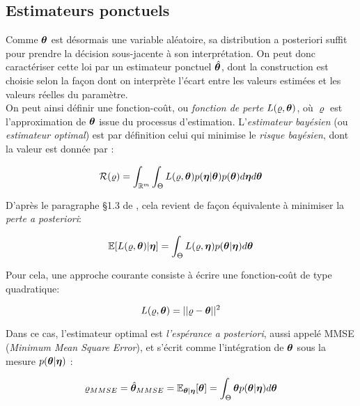 \subsection{Estimateurs ponctuels}
Comme ${\bm{\theta}}$ est désormais une variable aléatoire, sa distribution a posteriori suffit pour prendre la décision sous-jacente à son interprétation. On peut donc caractériser cette loi par un estimateur ponctuel $\hat{{\bm{\theta}}}$, dont la construction est choisie selon la façon dont on interprète l'écart entre les valeurs estimées et les valeurs réelles du paramètre.\\

On peut ainsi définir une fonction-coût, ou \textit{fonction de perte} $L(\varrho, {\bm{\theta}})$, où $\varrho$ est l'approximation de ${\bm{\theta}}$ issue du processus d'estimation. L'\textit{estimateur bayésien} (ou \textit{estimateur optimal}) est par définition celui qui minimise le \textit{risque bayésien}, dont la valeur est donnée par : 

\begin{equation}
	\mathcal{R}(\varrho) = \int_{\mathbb{R}^m} \int_{\Theta} L(\varrho,{\bm{\theta}})p({\bm{\eta}} | {\bm{\theta}})p({\bm{\theta}}) d{\bm{\eta}} d{\bm{\theta}}
	\label{eq_risque_bayesien}
\end{equation}

D'après le paragraphe §1.3 de \cite{Robert2004}, cela revient de façon équivalente à minimiser la \textit{perte a posteriori}:

\begin{equation}
	\mathbb{E}[L(\varrho,{\bm{\theta}})|{\bm{\eta}}] = \int_{\Theta} L(\varrho,{\bm{\eta}}){p({\bm{\theta}} | {\bm{\eta}})} d{\bm{\theta}}
	\label{eq_perte_a_posteriori}
\end{equation}

Pour cela, une approche courante consiste à écrire une fonction-coût de type quadratique:

\begin{equation}
	L(\varrho,{\bm{\theta}}) = || \varrho - {\bm{\theta}} ||^2
	\label{eq_fonction_cout_bayesien_quadratique}
\end{equation}
	
Dans ce cas, l'estimateur optimal est \textit{l'espérance a posteriori}, aussi appelé MMSE (\textit{Minimum Mean Square Error}), et s'écrit comme l'intégration de ${\bm{\theta}}$ sous la mesure $p({\bm{\theta}} | {\bm{\eta}})$ : 

\begin{equation}
	\varrho_{MMSE} = \hat{{\bm{\theta}}}_{MMSE} = \mathbb{E}_{{\bm{\theta}} | {\bm{\eta}}}[{\bm{\theta}}] = \int_{\Theta}{\bm{\theta}} {p({\bm{\theta}} | {\bm{\eta}})} d{\bm{\theta}}
	\label{eq_definition_mmse}
\end{equation}

